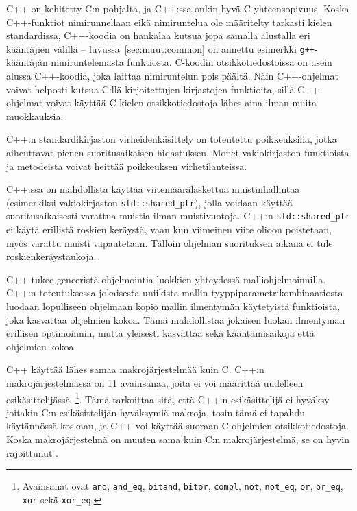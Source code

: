 C++ on kehitetty C:n pohjalta, ja C++:ssa onkin hyvä C-yhteensopivuus. Koska
C++\hyp{}funktiot nimirunnellaan eikä nimiruntelua ole määritelty tarkasti
kielen standardissa, C++-koodia on hankalaa kutsua jopa samalla alustalla eri
kääntäjien välillä -- luvussa~\ref{sec:muut:common} on annettu esimerkki
\texttt{g++}-kääntäjän nimiruntelemasta funktiosta. C-koodin
otsikkotiedostoissa on usein alussa C++-koodia, joka
laittaa nimiruntelun pois päältä. Näin C++-ohjelmat voivat helposti kutsua
C:llä kirjoitettujen kirjastojen funktioita, sillä C++-ohjelmat voivat käyttää
C-kielen otsikkotiedostoja lähes aina ilman muita muokkauksia.

C++:n standardikirjaston virheidenkäsittely on toteutettu poikkeuksilla, jotka
aiheuttavat pienen suoritusaikaisen hidastuksen. Monet vakiokirjaston funktioista ja
metodeista voivat heittää poikkeuksen virhetilanteissa.

C++:ssa on mahdollista käyttää viitemäärälaskettua
muistinhallintaa (esimerkiksi vakiokirjaston \texttt{std::shared\_ptr}), jolla
voidaan käyttää suoritusaikaisesti varattua muistia ilman muistivuotoja. C++:n
\texttt{std::shared\_ptr} ei käytä erillistä roskien keräystä, vaan kun
viimeinen viite olioon poistetaan, myös varattu muisti vapautetaan. Tällöin
ohjelman suorituksen aikana ei tule roskienkeräystaukoja.

C++ tukee geneeristä ohjelmointia luokkien
yhteydessä malliohjelmoinnilla. C++:n
toteutuksessa jokaisesta uniikista mallin tyyppiparametrikombinaatiosta luodaan
lopulliseen ohjelmaan kopio mallin ilmentymän käytetyistä
funktioista, joka kasvattaa ohjelmien kokoa. Tämä mahdollistaa jokaisen luokan
ilmentymän erillisen optimoinnin, mutta yleisesti kasvattaa sekä
kääntämisaikoja että ohjelmien kokoa.

C++ käyttää lähes samaa makrojärjestelmää kuin C. C++:n makrojärjestelmässä on
11 avainsanaa, joita ei voi määrittää uudelleen
esikäsittelijässä~\citep[luku~19.2]{CPP17}\footnote{ Avainsanat ovat
\texttt{and}, \texttt{and\_eq}, \texttt{bitand}, \texttt{bitor},
\texttt{compl}, \texttt{not}, \texttt{not\_eq}, \texttt{or}, \texttt{or\_eq},
\texttt{xor} sekä \texttt{xor\_eq}. }. Tämä tarkoittaa sitä, että C++:n
esikäsittelijä ei hyväksy joitakin C:n esikäsittelijän hyväksymiä makroja,
tosin tämä ei tapahdu käytännössä koskaan, ja C++ voi käyttää suoraan
C-ohjelmien otsikkotiedostoja. Koska makrojärjestelmä on muuten sama kuin C:n
makrojärjestelmä, se on hyvin rajoittunut \citep[luku~19]{CPP17}.

